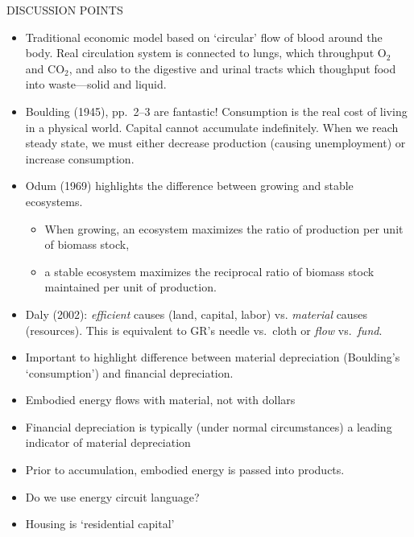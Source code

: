 DISCUSSION POINTS
\begin{itemize}
	\item{Traditional economic model based on `circular' flow of blood around the body. 
	Real circulation system is connected to lungs, which throughput O$_2$ and CO$_2$, 
	and also to the digestive and urinal tracts which thoughput food into waste---solid and liquid.}
	\item{Boulding (1945)\cite{Boulding1945}, pp.\ 2--3 are fantastic! Consumption is the real cost of living in a physical
	world. Capital cannot accumulate indefinitely.
	When we reach steady state, we must either decrease production (causing unemployment)
	or increase consumption.}
	\item{Odum (1969)\cite{Odum1969} highlights the difference between growing and stable ecosystems.}
		\begin{itemize}
			\item{When growing, an ecosystem maximizes the ratio of production per unit 
			of biomass stock,}
			\item{a stable ecosystem maximizes the reciprocal ratio of biomass stock 
			maintained per unit of production.}
		\end{itemize}
	\item{Daly (2002)\cite{Daly2002}: \emph{efficient} causes (land, capital, labor) vs. \emph{material} causes (resources).
	This is equivalent to GR's needle vs.\ cloth or \emph{flow} vs.\ \emph{fund}.}
	\item{Important to highlight difference between material depreciation (Boulding's `consumption') and financial depreciation.}
	\item{Embodied energy flows with material, not with dollars}
	\item{Financial depreciation is typically (under normal circumstances) a leading indicator of material depreciation}
	\item{Prior to accumulation, embodied energy is passed into products.}
	\item{Do we use energy circuit language?}
	\item{Housing is `residential capital'}
\end{itemize}

\cite{Daniels2001,Hoekstra2003}

